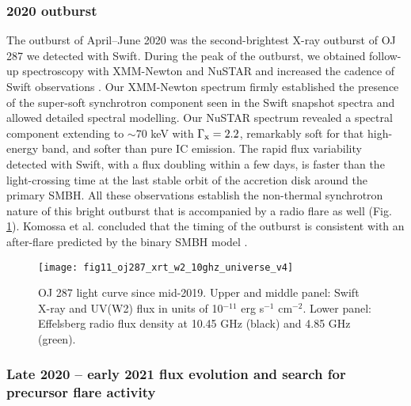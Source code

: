 \documentclass[preprints,article,accept,moreauthors,pdftex]{Definitions/mdpi}
\begin{document}
{\subsubsection{2020 outburst}

The outburst of April--June 2020 was the second-brightest X-ray outburst of OJ 287 we detected with Swift. During the peak of the outburst, we obtained follow-up spectroscopy with XMM-Newton and NuSTAR and increased the cadence of Swift observations \citep{Komossa2020}.  Our XMM-Newton spectrum firmly established the presence of the super-soft synchrotron component seen in the Swift snapshot spectra and allowed detailed spectral modelling. Our NuSTAR spectrum revealed a spectral component extending to $\sim$70 keV with $\Gamma_{\rm x}=2.2$, remarkably soft for that high-energy band, and softer than pure IC emission. 
The rapid flux variability detected with Swift, with a flux doubling within a few days, is faster than the light-crossing time at the last stable orbit of the accretion disk around the primary SMBH. All these observations establish the non-thermal synchrotron nature of this bright outburst that is accompanied by a radio flare as well (Fig. \ref{fig:Swift-EB-2019-21}). Komossa et al. \cite{Komossa2020} concluded that the timing of the outburst is consistent with an after-flare
predicted by the binary SMBH model \citep{Sundelius1997}. 

\begin{figure}
\begin{center}
\texttt{[image: fig11\_oj287\_xrt\_w2\_10ghz\_universe\_v4]}
	\caption{OJ 287 light curve since mid-2019. Upper and middle panel: Swift X-ray and UV(W2) flux in units of 10$^{-11}$ erg s$^{-1}$ cm$^{-2}$.  Lower panel: Effelsberg radio flux density at 10.45 GHz (black) and 4.85 GHz (green).
     }
     \label{fig:Swift-EB-2019-21}
\end{center}
\end{figure}

\subsubsection{Late 2020 -- early 2021 flux evolution and search for precursor flare activity}

}
\end{document}
